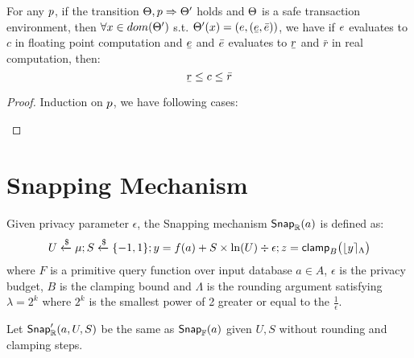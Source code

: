 \documentclass[a4paper,11pt]{article}
\begin{document}
\clearpage
\begin{thm}

For any $p$, if the transition 
$\Theta, p \Rightarrow \Theta'$ holds and $\Theta$ is a safe transaction environment, 
then $\forall x \in dom(\Theta')$ s.t. $\trsenv'(x) =(\expr, (\ubar{\expr}, \bar{\expr}))$, we have
if $e$ evaluates to $c$ in floating point computation and 
$\ubar{\expr}$ and $\bar{e}$ evaluates to $\ubar{r}$ and $\bar{r}$ in real computation, then: 
\[
\ubar{r} \leq c \leq \bar{r}
\]
\end{thm}
\begin{proof}
Induction on $p$, we have following cases:
\begin{itemize}
	\caseL{$\varx = \expr$}
	\caseL{$\varx \samplel \edistr$}
\end{itemize}

\end{proof}

\newpage
\section{Snapping Mechanism}

\begin{defn}
Given privacy parameter $\epsilon$, the Snapping mechanism $\mathsf{Snap}_{\mathbb{R}}(a)$ is defined as:
\[
	U \xleftarrow{\$} \mu; S \xleftarrow{\$} \{-1, 1\};
	y = f(a) + S \times \ln (U) \div \epsilon;
	z = \mathsf{clamp}_B \big(
	\lfloor y \rceil_{\Lambda}
	\big)
\]
where $F$ is a primitive query function over input database $a \in A$, $\epsilon$ is the privacy budget, $B$ is the clamping bound and $\Lambda$ is the rounding argument satisfying $\lambda = 2^k$ where $2^k$ is the smallest power of 2 greater or equal to the $\frac{1}{\epsilon}$.
%

%
Let $\mathsf{Snap}_{\mathbb{R}}'(a, U, S)$ be the same as $\mathsf{Snap}_{\mathbb{F}}(a)$ given $U, S$ without rounding and clamping steps.
\end{defn}


\end{document}
